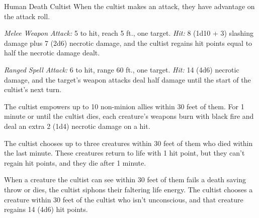 \documentclass[10pt,a4paper,twoside,bg=print,twocolumn,openany,nodeprecatedcode]{dndbook}
\begin{document}
\begin{DndMonster}[float=t]{Human Death Cultist}
\DndMonsterBasics[
armor-class = {16 (\textit{chain mail})},
hit-points = {\DndDice{8d8 + 24}},
speed = {30 ft.}
]
\DndMonsterAbilityScores[
 str = 16,
 dex = 10,
 con = 16,
 int = 14,
 wis = 18,
 cha = 12
]
\DndMonsterDetails[
saving-throws = {Wis +6, Cha +3},
skills = {Intimidation +3, Religion +4},
languages = {Common plus any one language},
challenge = 4,
]
When the cultist makes an attack, they have advantage on the attack roll.

\textsl{Melee Weapon Attack:} 5 to hit, reach 5 ft., one target. \textsl{Hit:} 8 (1d10 + 3) slashing damage plus 7 (2d6) necrotic damage, and the cultist regains hit points equal to half the necrotic damage dealt.

\textsl{Ranged Spell Attack:} 6 to hit, range 60 ft., one target. \textsl{Hit:} 14 (4d6) necrotic damage, and the target's weapon attacks deal half damage until the start of the cultist's next turn.

The cultist empowers up to 10 non-minion allies within 30 feet of them. For 1 minute or until the cultist dies, each creature's weapons burn with black fire and deal an extra 2 (1d4) necrotic damage on a hit.

The cultist chooses up to three creatures within 30 feet of them who died within the last minute. These creatures return to life with 1 hit point, but they can't regain hit points, and they die after 1 minute.

When a creature the cultist can see within 30 feet of them fails a death saving throw or dies, the cultist siphons their faltering life energy. The cultist chooses a creature within 30 feet of the cultist who isn't unconscious, and that creature regains 14 (4d6) hit points.

\end{DndMonster}
\end{document}
